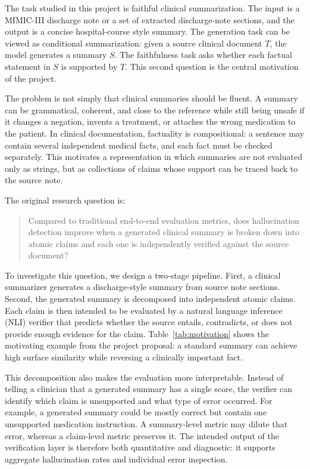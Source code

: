 \documentclass[11pt]{article}
\begin{document}
The task studied in this project is faithful clinical summarization. The input is a MIMIC-III discharge note or a set of extracted discharge-note sections, and the output is a concise hospital-course style summary. The generation task can be viewed as conditional summarization: given a source clinical document $T$, the model generates a summary $S$. The faithfulness task asks whether each factual statement in $S$ is supported by $T$. This second question is the central motivation of the project.

The problem is not simply that clinical summaries should be fluent. A summary can be grammatical, coherent, and close to the reference while still being unsafe if it changes a negation, invents a treatment, or attaches the wrong medication to the patient. In clinical documentation, factuality is compositional: a sentence may contain several independent medical facts, and each fact must be checked separately. This motivates a representation in which summaries are not evaluated only as strings, but as collections of claims whose support can be traced back to the source note.

The original research question is:
\begin{quote}
Compared to traditional end-to-end evaluation metrics, does hallucination detection improve when a generated clinical summary is broken down into atomic claims and each one is independently verified against the source document?
\end{quote}

To investigate this question, we design a two-stage pipeline. First, a clinical summarizer generates a discharge-style summary from source note sections. Second, the generated summary is decomposed into independent atomic claims. Each claim is then intended to be evaluated by a natural language inference (NLI) verifier that predicts whether the source entails, contradicts, or does not provide enough evidence for the claim. Table~\ref{tab:motivation} shows the motivating example from the project proposal: a standard summary can achieve high surface similarity while reversing a clinically important fact.

This decomposition also makes the evaluation more interpretable. Instead of telling a clinician that a generated summary has a single score, the verifier can identify which claim is unsupported and what type of error occurred. For example, a generated summary could be mostly correct but contain one unsupported medication instruction. A summary-level metric may dilute that error, whereas a claim-level metric preserves it. The intended output of the verification layer is therefore both quantitative and diagnostic: it supports aggregate hallucination rates and individual error inspection.
\end{document}
